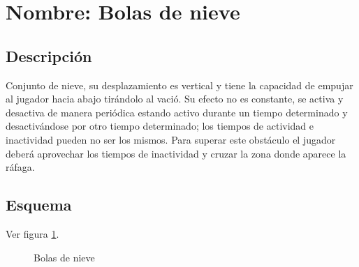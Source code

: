 		\section{Nombre: Bolas de nieve}\label{obs.bolasN}
	\subsection{Descripción}
	Conjunto de nieve, su desplazamiento es vertical y tiene la capacidad de empujar al jugador hacia abajo tirándolo al vació. Su efecto no es constante, se activa y desactiva de manera periódica estando activo durante un tiempo determinado y desactivándose por otro tiempo determinado; los tiempos de actividad e inactividad pueden no ser los mismos. Para superar este obstáculo el jugador deberá aprovechar los tiempos de inactividad y cruzar la zona donde aparece la ráfaga.
	\subsection{Esquema}
Ver figura \ref{fig:bolasN}.
	\begin{figure}
  \centering
  \caption{Bolas de nieve}
  \label{fig:bolasN}
\end{figure} 